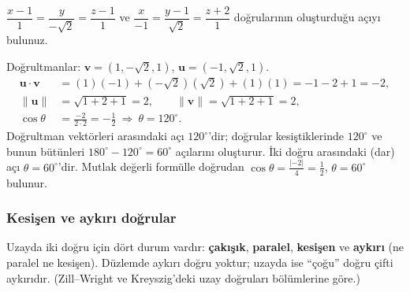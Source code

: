 \begin{soru}
$\dfrac{x-1}{1}=\dfrac{y}{-\sqrt2}=\dfrac{z-1}{1}$ ve $\dfrac{x}{-1}=\dfrac{y-1}{\sqrt2}=\dfrac{z+2}{1}$ doğrularının oluşturduğu açıyı bulunuz.
\end{soru}
\begin{cevap}
Doğrultmanlar: $\mathbf v=(1,-\sqrt2,1)$, $\mathbf u=(-1,\sqrt2,1)$.
\begin{align*}
\mathbf u\cdot\mathbf v&=(1)(-1)+(-\sqrt2)(\sqrt2)+(1)(1)=-1-2+1=-2,\\
\|\mathbf u\|&=\sqrt{1+2+1}=2,\qquad \|\mathbf v\|=\sqrt{1+2+1}=2,\\
\cos\theta&=\frac{-2}{2\cdot2}=-\frac12\ \Rightarrow\ \theta=120^\circ .
\end{align*}
Doğrultman vektörleri arasındaki açı $120^\circ$'dir; doğrular kesiştiklerinde $120^\circ$ ve bunun bütünleri $180^\circ-120^\circ=60^\circ$ açılarını oluşturur. İki doğru arasındaki (dar) açı $\boxed{\theta=60^\circ}$'dir. Mutlak değerli formülle doğrudan $\cos\theta=\frac{|-2|}{4}=\frac12$, $\theta=60^\circ$ bulunur.
\end{cevap}

\subsubsection{Kesişen ve aykırı doğrular}

\begin{bilgi}
Uzayda iki doğru için dört durum vardır: \textbf{çakışık}, \textbf{paralel}, \textbf{kesişen} ve \textbf{aykırı} (ne paralel ne kesişen). Düzlemde aykırı doğru yoktur; uzayda ise ``çoğu'' doğru çifti aykırıdır. (Zill--Wright ve Kreyszig'deki uzay doğruları bölümlerine göre.)
\end{bilgi}

